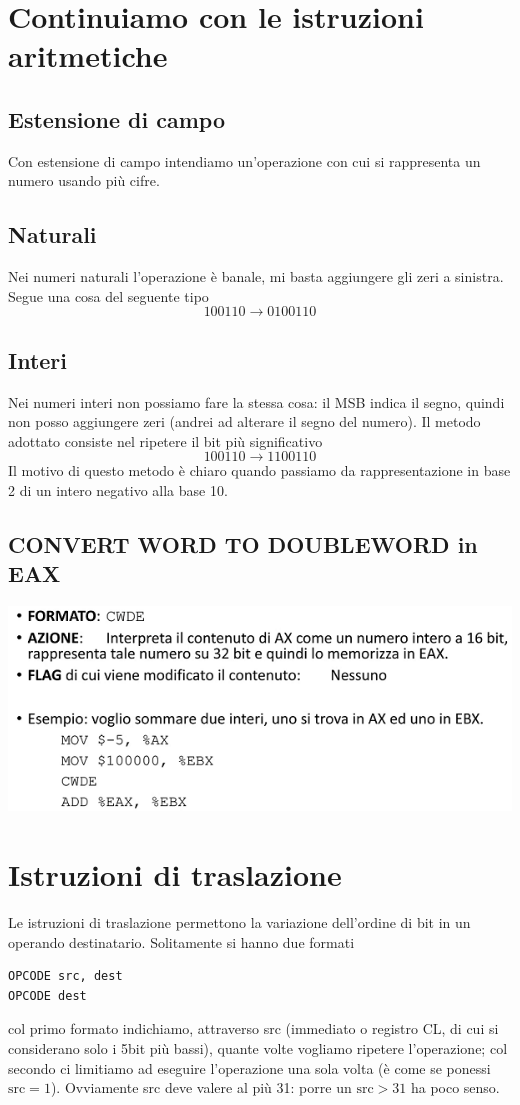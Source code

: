 \documentclass[11pt]{report}
\begin{document}
\section{Continuiamo con le istruzioni aritmetiche}
\subsection{Estensione di campo}
Con estensione di campo intendiamo un'operazione con cui si rappresenta un numero usando più cifre.
\subsection{Naturali}
Nei numeri naturali l'operazione è banale, mi basta aggiungere gli zeri a sinistra. Segue una cosa del seguente tipo
\[100110 \longrightarrow \boxed{0}100110\]
\subsection{Interi}
Nei numeri interi non possiamo fare la stessa cosa: il MSB indica il segno, quindi non posso aggiungere zeri (andrei ad alterare il segno del numero). Il metodo adottato consiste nel ripetere il bit più significativo
\[100110 \longrightarrow \boxed{1}100110\]
Il motivo di questo metodo è chiaro quando passiamo da rappresentazione in base 2 di un intero negativo alla base 10.
\subsection{CONVERT WORD TO DOUBLEWORD in EAX}
\begin{center}
\includegraphics{img/23.PNG}
\end{center}

\section{Istruzioni di traslazione}
Le istruzioni di traslazione permettono la variazione dell'ordine di bit in un operando destinatario. Solitamente si hanno due formati
\begin{verbatim}
OPCODE src, dest
OPCODE dest
\end{verbatim}
col primo formato indichiamo, attraverso src (immediato o registro CL, di cui si considerano solo i 5bit più bassi), quante volte vogliamo ripetere l'operazione; col secondo ci limitiamo ad eseguire l'operazione una sola volta (è come se ponessi $\text{src}=1$). Ovviamente src deve valere al più 31: porre un $\text{src} > 31$ ha poco senso.
\end{document}
